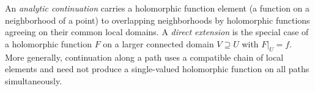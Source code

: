 
An \emph{analytic continuation} carries a holomorphic function element (a function on a neighborhood of a point) to overlapping neighborhoods by holomorphic functions agreeing on their common local domains. A \emph{direct extension} is the special case of a holomorphic function $F$ on a larger connected domain $V\supseteq U$ with $F|_U=f$. More generally, continuation along a path uses a compatible chain of local elements and need not produce a single-valued holomorphic function on all paths simultaneously.
